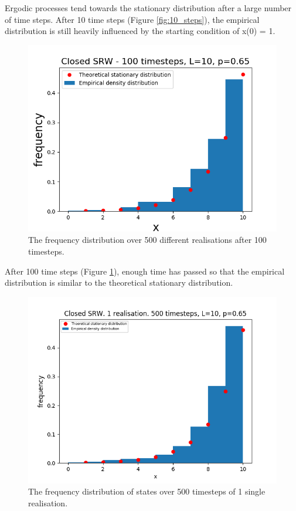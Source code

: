\documentclass{article}
\begin{document}
Ergodic processes tend towards the stationary distribution after a large number of time steps. After 10 time steps (Figure \ref{fig:10_steps}), the empirical distribution is still heavily influenced by the starting condition of x(0) = 1. 

\begin{figure}[H]
\includegraphics[scale=0.8]{100_steps_b.png} 
\caption{The frequency distribution over 500 different realisations after 100 timesteps.}
\label{fig:100_steps_a}
\end{figure}

After 100 time steps (Figure \ref{fig:100_steps_a}), enough time has passed so that the empirical distribution is similar to the theoretical stationary distribution.


\begin{figure}[H]
\includegraphics[scale=0.8]{500_steps_c.png} 
\caption{The frequency distribution of states over 500 timesteps of 1 single realisation.}
\label{fig:500_steps}
\end{figure}
\end{document}

